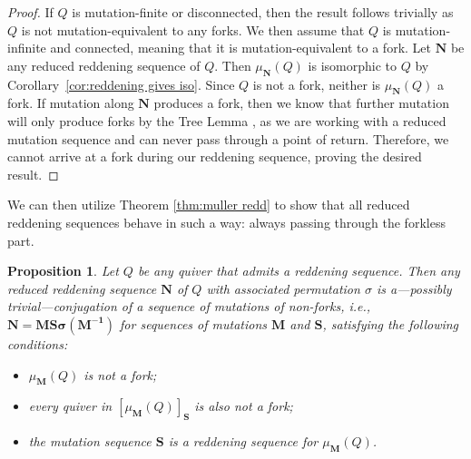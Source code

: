 \documentclass[11pt, letterpaper]{amsart}
\newtheorem{proposition}[theorem]{Proposition}
\theoremstyle{definition}
\numberwithin{equation}{section}
\begin{document}
\begin{proof}
    If $Q$ is mutation-finite or disconnected, then the result follows trivially as $Q$ is not mutation-equivalent to any forks.
    We then assume that $Q$ is mutation-infinite and connected, meaning that it is mutation-equivalent to a fork.
    Let $\mathbf{N}$ be any reduced reddening sequence of $Q$.
    Then $\mu_{\mathbf{N}}(Q)$ is isomorphic to $Q$ by Corollary~\ref{cor:reddening gives iso}.
    Since $Q$ is not a fork, neither is $\mu_{\mathbf{N}}(Q)$ a fork.
    If mutation along $\mathbf{N}$ produces a fork, then we know that further mutation will only produce forks by the Tree Lemma \cite[Lemma~2.8]{warkentin2014exchange}, as we are working with a reduced mutation sequence and can never pass through a point of return.
    Therefore, we cannot arrive at a fork during our reddening sequence, proving the desired result.
\end{proof}

We can then utilize Theorem \ref{thm:muller redd} to show that all reduced reddening sequences behave in such a way: always passing through the forkless part.

\begin{proposition}\label{prop:reddening-forks}
    Let $Q$ be any quiver that admits a reddening sequence.
    Then any reduced reddening sequence $\mathbf{N}$ of $Q$ with associated permutation $\sigma$ is a---possibly trivial---conjugation of a sequence of mutations of non-forks, i.e., $\mathbf{N} = \mathbf{MS\sigma(\mathbf{M}^{-1})}$ for sequences of mutations $\mathbf{M}$ and $ \mathbf{S}$, satisfying the following conditions:
    \begin{itemize}
        \item $\mu_{\mathbf{M}}(Q)$ is not a fork;

        \item every quiver in $[\mu_{\mathbf{M}}(Q)]_\mathbf{S}$ is also not a fork;

        \item the mutation sequence $\mathbf{S}$ is a reddening sequence for $\mu_{\mathbf{M}}(Q)$.
    \end{itemize}
    
\end{proposition} 
\end{document}
